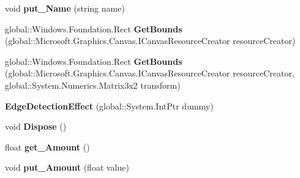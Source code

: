 \begin{DoxyCompactItemize}
void {\bfseries put\+\_\+\+Name} (string name)
\item 
\mbox{\label{class_microsoft_1_1_graphics_1_1_canvas_1_1_effects_1_1_edge_detection_effect_a05dbef4b9e01ccf2927bea9316a0cc4c}} 
global\+::\+Windows.\+Foundation.\+Rect {\bfseries Get\+Bounds} (global\+::\+Microsoft.\+Graphics.\+Canvas.\+I\+Canvas\+Resource\+Creator resource\+Creator)
\item 
\mbox{\label{class_microsoft_1_1_graphics_1_1_canvas_1_1_effects_1_1_edge_detection_effect_a633113ef50a9947d0a1e0964566587d8}} 
global\+::\+Windows.\+Foundation.\+Rect {\bfseries Get\+Bounds} (global\+::\+Microsoft.\+Graphics.\+Canvas.\+I\+Canvas\+Resource\+Creator resource\+Creator, global\+::\+System.\+Numerics.\+Matrix3x2 transform)
\item 
\mbox{\label{class_microsoft_1_1_graphics_1_1_canvas_1_1_effects_1_1_edge_detection_effect_a9542f96d28e629e75fc7549550e42caf}} 
{\bfseries Edge\+Detection\+Effect} (global\+::\+System.\+Int\+Ptr dummy)
\item 
\mbox{\label{class_microsoft_1_1_graphics_1_1_canvas_1_1_effects_1_1_edge_detection_effect_a4ef78a65aa6c4075fd46d5020462a100}} 
void {\bfseries Dispose} ()
\item 
\mbox{\label{class_microsoft_1_1_graphics_1_1_canvas_1_1_effects_1_1_edge_detection_effect_abb9b39bb3406ac6a4e812bd40512b749}} 
float {\bfseries get\+\_\+\+Amount} ()
\item 
\mbox{\label{class_microsoft_1_1_graphics_1_1_canvas_1_1_effects_1_1_edge_detection_effect_a35679bc6700b81e40b2e61ff0a065a2e}} 
void {\bfseries put\+\_\+\+Amount} (float value)
\item 
\mbox{\label{class_microsoft_1_1_graphics_1_1_canvas_1_1_effects_1_1_edge_detection_effect_ae48b3056466454ff45406d2d9be05f6b}} 

\end{DoxyCompactItemize}
